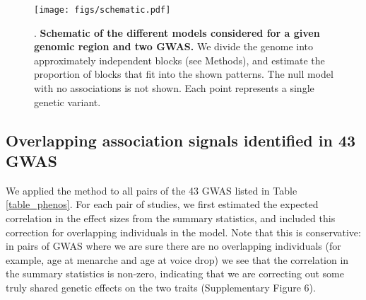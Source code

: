 \documentclass[11pt,titlepage]{article}
\begin{document}
\begin{figure}
\begin{center}
\texttt{[image: figs/schematic.pdf]}
\caption{. \textbf{Schematic of the different models considered for a given genomic region and two GWAS.} We divide the genome into approximately independent blocks (see Methods), and estimate the proportion of blocks that fit into the shown patterns. The null model with no associations is not shown. Each point represents a single genetic variant.}\label{f_schematic}
\end{center}
\end{figure}


\subsection{Overlapping association signals identified in 43 GWAS}
We applied the method to all pairs of the 43 GWAS listed in Table \ref{table_phenos}.
For each pair of studies, we first estimated the expected correlation in the effect sizes from the summary statistics, and included this correction for overlapping individuals in the model. 
Note that this is conservative: in pairs of GWAS where we are sure there are no overlapping individuals (for example, age at menarche and age at voice drop) we see that the correlation in the summary statistics is non-zero, indicating that we are correcting out some truly shared genetic effects on the two traits (Supplementary Figure 6).
\end{document}
